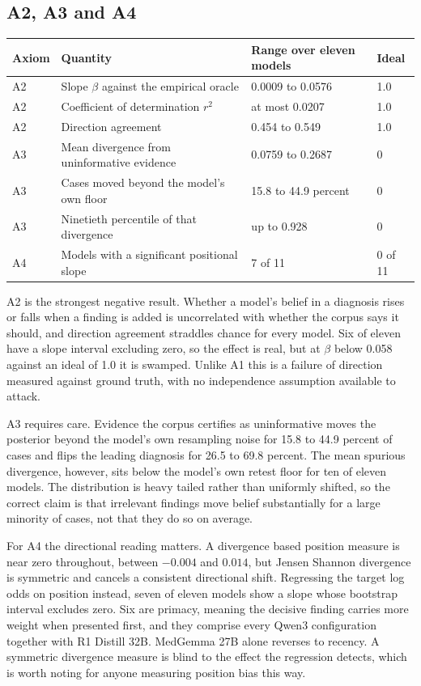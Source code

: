 \documentclass[10pt]{article}
\begin{document}
\subsection{A2, A3 and A4}
\begin{center}
\footnotesize
\begin{tabular}{@{}llll@{}}
\toprule
Axiom & Quantity & Range over eleven models & Ideal \\
\midrule
A2 & Slope $\beta$ against the empirical oracle & 0.0009 to 0.0576 & 1.0 \\
A2 & Coefficient of determination $r^2$ & at most 0.0207 & 1.0 \\
A2 & Direction agreement & 0.454 to 0.549 & 1.0 \\
A3 & Mean divergence from uninformative evidence & 0.0759 to 0.2687 & 0 \\
A3 & Cases moved beyond the model's own floor & 15.8 to 44.9 percent & 0 \\
A3 & Ninetieth percentile of that divergence & up to 0.928 & 0 \\
A4 & Models with a significant positional slope & 7 of 11 & 0 of 11 \\
\bottomrule
\end{tabular}
\end{center}

A2 is the strongest negative result. Whether a model's belief in a diagnosis rises or falls when a
finding is added is uncorrelated with whether the corpus says it should, and direction agreement
straddles chance for every model. Six of eleven have a slope interval excluding zero, so the effect
is real, but at $\beta$ below 0.058 against an ideal of 1.0 it is swamped. Unlike A1 this is a
failure of direction measured against ground truth, with no independence assumption available to
attack.

A3 requires care. Evidence the corpus certifies as uninformative moves the posterior beyond the
model's own resampling noise for 15.8 to 44.9 percent of cases and flips the leading diagnosis for
26.5 to 69.8 percent. The mean spurious divergence, however, sits below the model's own retest floor
for ten of eleven models. The distribution is heavy tailed rather than uniformly shifted, so the
correct claim is that irrelevant findings move belief substantially for a large minority of cases,
not that they do so on average.

For A4 the directional reading matters. A divergence based position measure is near zero throughout,
between $-0.004$ and $0.014$, but Jensen Shannon divergence is symmetric and cancels a consistent
directional shift. Regressing the target log odds on position instead, seven of eleven models show a
slope whose bootstrap interval excludes zero. Six are primacy, meaning the decisive finding carries
more weight when presented first, and they comprise every Qwen3 configuration together with R1
Distill 32B. MedGemma 27B alone reverses to recency. A symmetric divergence measure is blind to the
effect the regression detects, which is worth noting for anyone measuring position bias this way.
\end{document}
